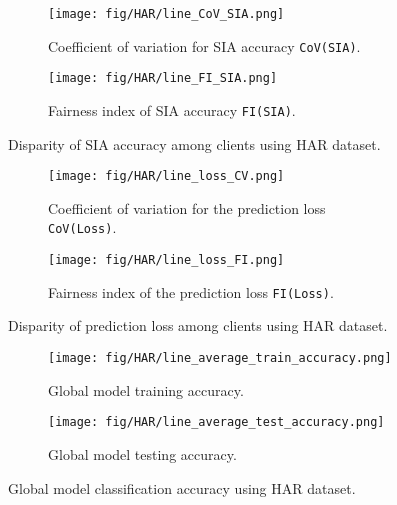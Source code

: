 \begin{figure}[!t]
  \centering
  \begin{subfigure}[b]{0.99\columnwidth}
    \centering
    \texttt{[image: fig/HAR/line\_CoV\_SIA.png]}
    \caption{Coefficient of variation for SIA accuracy \texttt{CoV(SIA)}.}
    \label{fig:SIACV}
  \end{subfigure}
  \hfill
  \begin{subfigure}[b]{0.99\columnwidth}
    \centering
    \texttt{[image: fig/HAR/line\_FI\_SIA.png]}
    \caption{Fairness index of SIA accuracy \texttt{FI(SIA)}.}
    \label{fig:SIAFI}
  \end{subfigure}
  \caption{Disparity of SIA accuracy among clients using HAR dataset. }
  \label{fig:SIA}
\end{figure}



\begin{figure}[!t]
  \centering
  \begin{subfigure}[b]{0.99\columnwidth}
    \centering
    \texttt{[image: fig/HAR/line\_loss\_CV.png]}
    \caption{Coefficient of variation for the prediction loss \texttt{CoV(Loss)}.}
    \label{fig:lossCV}
  \end{subfigure}
  \hfill
  \begin{subfigure}[b]{0.99\columnwidth}
    \centering
    \texttt{[image: fig/HAR/line\_loss\_FI.png]}
    \caption{Fairness index of the prediction loss \texttt{FI(Loss)}.}
    \label{fig:lossFI}
  \end{subfigure}
  \caption{Disparity of prediction loss among clients using HAR dataset. }
  \label{fig:loss}
\end{figure}


\begin{figure}
  \centering
  \begin{subfigure}[b]{0.99\columnwidth}
    \centering
    \texttt{[image: fig/HAR/line\_average\_train\_accuracy.png]}
    \caption{Global model training accuracy.}
    \label{fig:accCV}
  \end{subfigure}
  \hfill
  \begin{subfigure}[b]{0.99\columnwidth}
    \centering
    \texttt{[image: fig/HAR/line\_average\_test\_accuracy.png]}
    \caption{Global model testing accuracy.}
    \label{fig:accFI}
  \end{subfigure}
  \caption{Global model classification accuracy using HAR dataset.}
  \label{fig:accu}
\end{figure}







